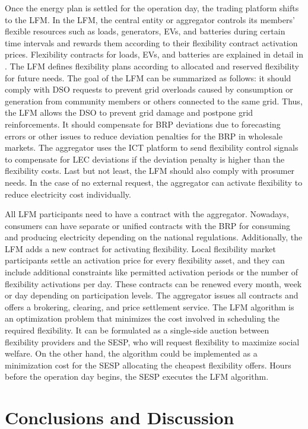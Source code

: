 Once the energy plan is settled for the operation day, the trading platform shifts to the LFM. In the LFM, the central entity or aggregator controls its members' flexible resources such as loads, generators, EVs, and batteries during certain time intervals and rewards them according to their flexibility contract activation prices. Flexibility contracts for loads, EVs, and batteries are explained in detail in \cite{Olivella2018}. The LFM defines flexibility plans according to allocated and reserved flexibility for future needs. The goal of the LFM can be summarized as follows: it should comply with DSO requests to prevent grid overloads caused by consumption
or generation from community members or others connected to the same grid. Thus, the LFM allows the DSO to prevent grid damage and postpone grid reinforcements. It should compensate for BRP deviations due to forecasting errors or other issues to reduce deviation penalties for the BRP in wholesale markets. The aggregator uses the ICT platform to send flexibility control signals to compensate for LEC deviations if the deviation penalty is higher than the flexibility costs. Last but not least, the LFM should also comply with
prosumer needs. In the case of no external request, the aggregator can activate flexibility to reduce electricity cost individually.

All LFM participants need to have a contract with the aggregator. Nowadays, consumers can have separate or unified contracts with the BRP for consuming and producing electricity depending on the national regulations. Additionally, the LFM adds a new contract for activating flexibility. Local flexibility market participants settle an activation price for every flexibility asset, and they can include additional constraints like permitted activation periods or the number of flexibility activations per day. These contracts can be renewed every month, week or day depending on participation levels. The aggregator issues all contracts and offers a
brokering, clearing, and price settlement service. The LFM algorithm is an optimization problem that minimizes the cost involved in scheduling the required flexibility. It can be formulated as a single-side auction between flexibility providers and the SESP, who will request flexibility to maximize social welfare. On the other hand, the algorithm could be implemented as a minimization cost for the SESP allocating the cheapest flexibility offers. Hours before the operation day begins, the SESP executes the LFM algorithm.

\section{Conclusions and Discussion} \label{sec:conclusions}

